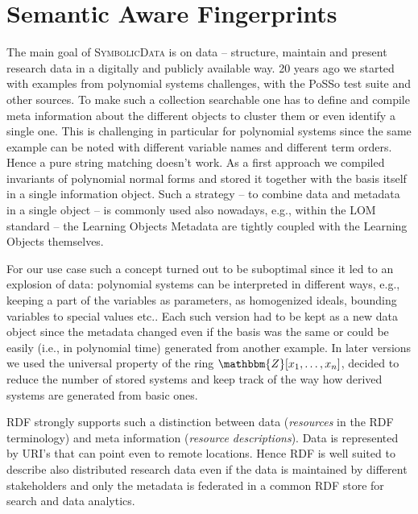 \documentclass[12pt]{article}
\def\SD{\textsc{Sym\-bolic\-Data}}
\begin{document}
\section{Semantic Aware Fingerprints}

The main goal of {\SD} is on data -- structure, maintain and present research
data in a digitally and publicly available way. 20 years ago we started with
examples from polynomial systems challenges, with the PoSSo test suite and
other sources. To make such a collection searchable one has to define and
compile meta information about the different objects to cluster them or even
identify a single one. This is challenging in particular for polynomial systems
since the same example can be noted with different variable names and different
term orders.  Hence a pure string matching doesn't work.  As a first approach
we compiled invariants of polynomial normal forms and stored it together with
the basis itself in a single information object.  Such a strategy -- to combine
data and metadata in a single object -- is commonly used also nowadays, e.g.,
within the LOM standard -- the Learning Objects Metadata are tightly coupled
with the Learning Objects themselves.

For our use case such a concept turned out to be suboptimal since it led to an
explosion of data: polynomial systems can be interpreted in different ways,
e.g., keeping a part of the variables as parameters, as homogenized ideals,
bounding variables to special values etc.. Each such version had to be kept as
a new data object since the metadata changed even if the basis was the same or
could be easily (i.e., in polynomial time) generated from another example. In
later versions we used the universal property of the ring
$\mathbbm{Z}[x_1,\dots,x_n]$, decided to reduce the number of stored systems
and keep track of the way how derived systems are generated from basic ones.

RDF strongly supports such a distinction between data (\emph{resources} in the
RDF terminology) and meta information (\emph{resource descriptions}). Data is
represented by URI's that can point even to remote locations.  Hence RDF is
well suited to describe also distributed research data even if the data is
maintained by different stakeholders and only the metadata is federated in a
common RDF store for search and data analytics.
\end{document}
